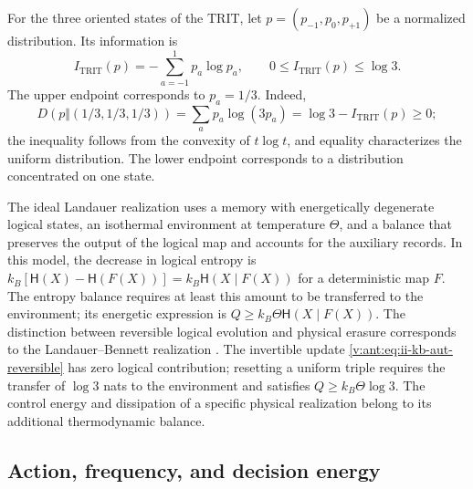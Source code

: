 For the three oriented states of the TRIT, let
\(p=(p_{-1},p_0,p_{+1})\) be a normalized distribution. Its information is
\begin{equation}
 I_{\mathrm{TRIT}}(p)=-\sum_{a=-1}^{1}p_a\log p_a,
 \qquad 0\leq I_{\mathrm{TRIT}}(p)\leq\log3.
 \label{v:ant:eq:ii-kb-aut-trit}
\end{equation}
The upper endpoint corresponds to \(p_a=1/3\). Indeed,
\[
 D(p\Vert(1/3,1/3,1/3))
 =\sum_ap_a\log(3p_a)=\log3-I_{\mathrm{TRIT}}(p)\geq0;
\]
the inequality follows from the convexity of \(t\log t\), and
equality characterizes the uniform distribution. The lower endpoint
corresponds to a distribution concentrated on one state.

The ideal Landauer realization uses a memory with energetically
degenerate logical states, an isothermal environment at temperature \(\Theta\),
and a balance that preserves the output of the logical map and accounts for
the auxiliary records. In this model, the decrease in logical entropy is
\(k_B[\mathsf H(X)-\mathsf H(F(X))]
=k_B\mathsf H(X\mid F(X))\) for a deterministic map \(F\).
The entropy balance requires at least this amount to be transferred to the environment;
its energetic expression is \(Q\geq k_B\Theta\mathsf H(X\mid F(X))\).
The distinction between reversible logical evolution and physical erasure
corresponds to the Landauer--Bennett realization \cite{bennett2003}.
The invertible update
\eqref{v:ant:eq:ii-kb-aut-reversible} has zero logical contribution; resetting
a uniform triple requires the transfer of \(\log3\) nats
to the environment and satisfies \(Q\geq k_B\Theta\log3\).
The control energy and dissipation of a specific physical realization
belong to its additional thermodynamic balance.

\subsection{Action, frequency, and decision energy}

